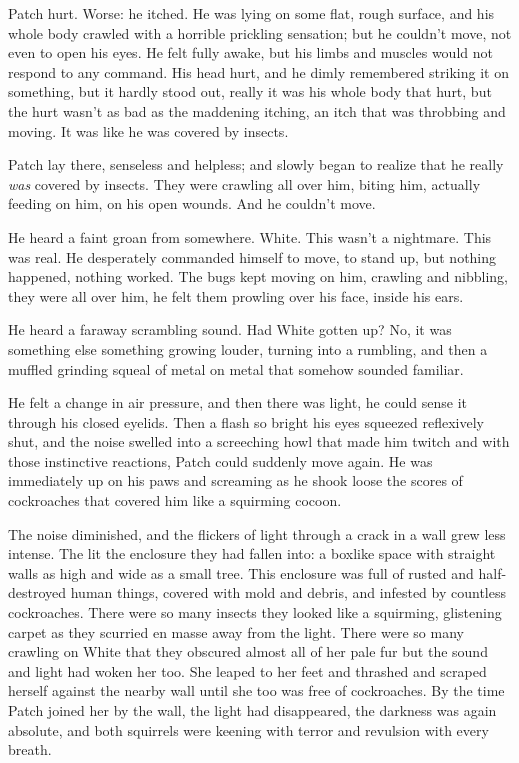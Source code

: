 \documentclass[12pt]{book}
\begin{document}
 Patch hurt. Worse: he itched. He was lying on some flat, rough surface, and his whole body crawled with a horrible prickling sensation; but he couldn't move, not even to open his eyes. He felt fully awake, but his limbs and muscles would not respond to any command. His head hurt, and he dimly remembered striking it on something, but it hardly stood out, really it was his whole body that hurt, but the hurt wasn't as bad as the maddening itching, an itch that was throbbing and moving. It was like he was covered by insects.\par
 Patch lay there, senseless and helpless; and slowly began to realize that he really {\it was} covered by insects. They were crawling all over him, biting him, actually feeding on him, on his open wounds. And he couldn't move.\par
 He heard a faint groan from somewhere. White. This wasn't a nightmare. This was real. He desperately commanded himself to move, to stand up, but nothing happened, nothing worked. The bugs kept moving on him, crawling and nibbling, they were all over him, he felt them prowling over his face, inside his ears.\par
 He heard a faraway scrambling sound. Had White gotten up? No, it was something else %
 something growing louder, turning into a rumbling, and then a muffled grinding squeal of metal on metal that somehow sounded familiar.\par
 He felt a change in air pressure, and then there was light, he could sense it through his closed eyelids. Then a flash so bright his eyes squeezed reflexively shut, and the noise swelled into a screeching howl that made him twitch %
 and with those instinctive reactions, Patch could suddenly move again. He was immediately up on his paws and screaming as he shook loose the scores of cockroaches that covered him like a squirming cocoon.\par
 The noise diminished, and the flickers of light through a crack in a wall grew less intense. The lit the enclosure they had fallen into: a boxlike space with straight walls as high and wide as a small tree. This enclosure was full of rusted and half-destroyed human things, covered with mold and debris, and infested by countless cockroaches. There were so many insects they looked like a squirming, glistening carpet as they scurried en masse away from the light. There were so many crawling on White that they obscured almost all of her pale fur %
 but the sound and light had woken her too. She leaped to her feet and thrashed and scraped herself against the nearby wall until she too was free of cockroaches. By the time Patch joined her by the wall, the light had disappeared, the darkness was again absolute, and both squirrels were keening with terror and revulsion with every breath.\par
\end{document}
